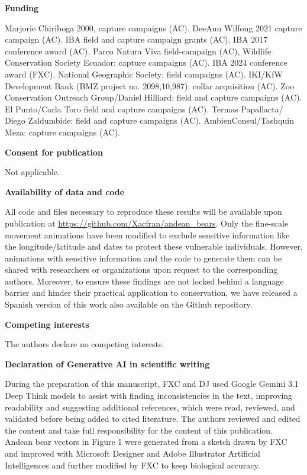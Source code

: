 \documentclass[lineno,referee,pdflatex,sn-vancouver-num]{sn-jnl}%
\theoremstyle{thmstyleone}%
\theoremstyle{thmstyletwo}%
\theoremstyle{thmstylethree}%
\begin{document}
\noindent\textbf{Funding}

Marjorie Chiriboga 2000, capture campaigns (AC). DeeAnn Wilfong 2021 capture campaign (AC). IBA field and capture campaign grants (AC). IBA 2017 conference award (AC). Parco Natura Viva field-campaign (AC), Wildlife Conservation Society Ecuador: capture campaigns (AC). IBA 2024 conference award (FXC). National Geographic Society: field campaigns (AC). IKI/KfW Development Bank (BMZ project no.  2098,10,987): collar acquisition (AC). Zoo Conservation Outreach Group/Daniel Hilliard: field and capture campaigns (AC).
El Punto/Carla Toro field and capture campaigns (AC). Termas Papallacta/ Diego Zaldumbide: field and capture campaigns (AC). AmbienConsul/Tashquin Meza: capture campaigns (AC).

\noindent\textbf{Consent for publication}

Not applicable.

\noindent\textbf{Availability of data and code}

All code and files necessary to reproduce these results will be available upon publication at \url{https://github.com/Xacfran/andean\_bears}. Only the fine-scale movement animations have been modified to exclude sensitive information like the longitude/latitude and dates to protect these vulnerable individuals. However, animations with sensitive information and the code to generate them can be shared with researchers or organizations upon request to the corresponding authors. Moreover, to ensure these findings are not locked behind a language barrier and hinder their practical application to conservation, we have released a Spanish version of this work also available on the Github repository.

\noindent\textbf{Competing interests}

The authors declare no competing interests.

\noindent\textbf{Declaration of Generative AI in scientific writing}

During the preparation of this manuscript, FXC and DJ used Google Gemini 3.1 Deep Think models to assist with finding inconsistencies in the text, improving readability and suggesting additional references, which were read, reviewed, and validated before being added to cited literature. The authors reviewed and edited the content and take full responsibility for the content of this publication.
Andean bear vectors in Figure 1 were generated from a sketch drawn by FXC and improved with Microsoft Designer and Adobe Illustrator Artificial Intelligences and further modified by FXC to keep biological accuracy.
\end{document}
